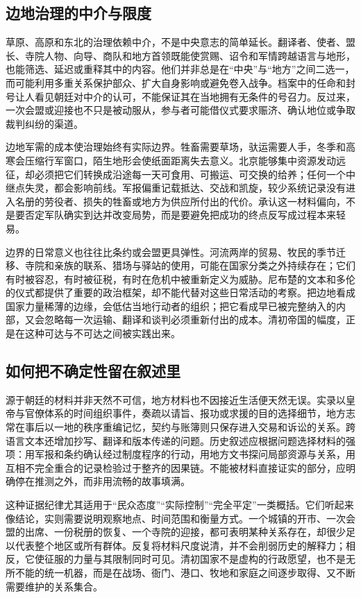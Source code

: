 \subsection*{边地治理的中介与限度}
草原、高原和东北的治理依赖中介，不是中央意志的简单延长。翻译者、使者、盟长、寺院人物、向导、商队和地方首领既能使赏赐、诏令和军情跨越语言与地形，也能筛选、延迟或重释其中的内容。他们并非总是在“中央”与“地方”之间二选一，而可能利用多重关系保护部众、扩大自身影响或避免卷入战争。档案中的任命和封号让人看见朝廷对中介的认可，不能保证其在当地拥有无条件的号召力。反过来，一次会盟或迎接也不只是被动服从，参与者可能借仪式要求赈济、确认地位或争取裁判纠纷的渠道。

边地军需的成本使治理始终有实际边界。牲畜需要草场，驮运需要人手，冬季和高寒会压缩行军窗口，陌生地形会使纸面距离失去意义。北京能够集中资源发动远征，却必须把它们转换成沿途每一天可食用、可搬运、可交换的给养；任何一个中继点失灵，都会影响前线。军报偏重记载抵达、交战和凯旋，较少系统记录没有进入名册的劳役者、损失的牲畜或地方为供应所付出的代价。承认这一材料偏向，不是要否定军队确实到达并改变局势，而是要避免把成功的终点反写成过程本来轻易。

边界的日常意义也往往比条约或会盟更具弹性。河流两岸的贸易、牧民的季节迁移、寺院和亲族的联系、猎场与驿站的使用，可能在国家分类之外持续存在；它们有时被容忍，有时被征税，有时在危机中被重新定义为威胁。尼布楚的文本和多伦的仪式都提供了重要的政治框架，却不能代替对这些日常活动的考察。把边地看成国家力量稀薄的边缘，会低估当地行动者的组织；把它看成早已被完整纳入的内部，又会忽略每一次运输、翻译和谈判必须重新付出的成本。清初帝国的幅度，正是在这种可达与不可达之间被实践出来。

\subsection*{如何把不确定性留在叙述里}
源于朝廷的材料并非天然不可信，地方材料也不因接近生活便天然无误。实录以皇帝与官僚体系的时间组织事件，奏疏以请旨、报功或求援的目的选择细节，地方志常在事后以一地的秩序重编记忆，契约与账簿则只保存进入交易和诉讼的关系。跨语言文本还增加抄写、翻译和版本传递的问题。历史叙述应根据问题选择材料的强项：用军报和条约确认经过制度程序的行动，用地方文书探问局部资源与关系，用互相不完全重合的记录检验过于整齐的因果链。不能被材料直接证实的部分，应明确停在推测之外，而非用流畅的故事填满。

这种证据纪律尤其适用于“民众态度”“实际控制”“完全平定”一类概括。它们听起来像结论，实则需要说明观察地点、时间范围和衡量方式。一个城镇的开市、一次会盟的出席、一份税册的恢复、一个寺院的迎接，都可表明某种关系存在，却很少足以代表整个地区或所有群体。反复将材料尺度说清，并不会削弱历史的解释力；相反，它使征服的力量与其限制同时可见。清初国家不是虚构的行政愿望，也不是无所不能的统一机器，而是在战场、衙门、港口、牧地和家庭之间逐步取得、又不断需要维护的关系集合。

